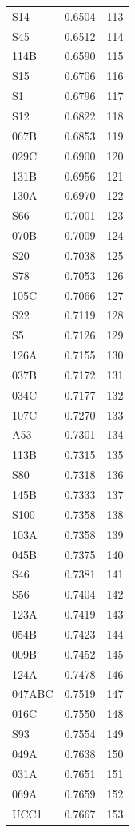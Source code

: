 \begin{longtable}{lrr}
  S14 & 0.6504 & 113 \\
  S45 & 0.6512 & 114 \\
  114B & 0.6590 & 115 \\
  S15 & 0.6706 & 116 \\
  S1 & 0.6796 & 117 \\
  S12 & 0.6822 & 118 \\
  067B & 0.6853 & 119 \\
  029C & 0.6900 & 120 \\
  131B & 0.6956 & 121 \\
  130A & 0.6970 & 122 \\
  S66 & 0.7001 & 123 \\
  070B & 0.7009 & 124 \\
  S20 & 0.7038 & 125 \\
  S78 & 0.7053 & 126 \\
  105C & 0.7066 & 127 \\
  S22 & 0.7119 & 128 \\
  S5 & 0.7126 & 129 \\
  126A & 0.7155 & 130 \\
  037B & 0.7172 & 131 \\
  034C & 0.7177 & 132 \\
  107C & 0.7270 & 133 \\
  A53 & 0.7301 & 134 \\
  113B & 0.7315 & 135 \\
  S80 & 0.7318 & 136 \\
  145B & 0.7333 & 137 \\
  S100 & 0.7358 & 138 \\
  103A & 0.7358 & 139 \\
  045B & 0.7375 & 140 \\
  S46 & 0.7381 & 141 \\
  S56 & 0.7404 & 142 \\
  123A & 0.7419 & 143 \\
  054B & 0.7423 & 144 \\
  009B & 0.7452 & 145 \\
  124A & 0.7478 & 146 \\
  047ABC & 0.7519 & 147 \\
  016C & 0.7550 & 148 \\
  S93 & 0.7554 & 149 \\
  049A & 0.7638 & 150 \\
  031A & 0.7651 & 151 \\
  069A & 0.7659 & 152 \\
  UCC1 & 0.7667 & 153 \\

\end{longtable}
